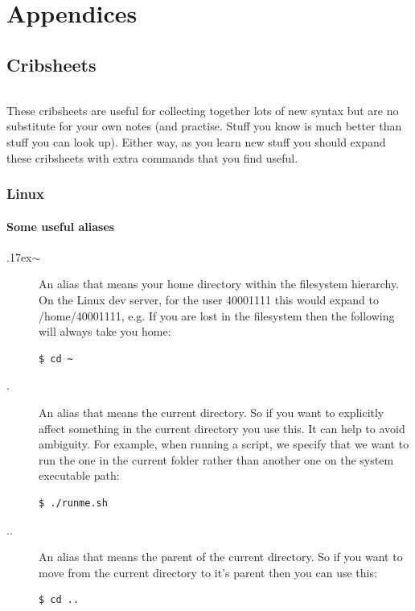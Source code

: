 \documentclass[12pt, a4paper, oneside]{book}
\begin{document}
{\part{Appendices}

\appendix
\chapter{Cribsheets}
\label{cribsheets}
\paragraph{} These cribsheets are useful for collecting together lots of new syntax but are no substitute for your own notes (and practise. Stuff you know is much better than stuff you can look up). Either way, as you learn new stuff you should expand these cribsheets with extra commands that you find useful.

\section{Linux}
\label{cribsheet_linux}

\subsection{Some useful aliases}

\begin{description}
\item[{\raise.17ex\hbox{$\scriptstyle\sim$}}] An alias that means your home directory within the filesystem hierarchy. On the Linux dev server, for the user 40001111 this would expand to /home/40001111, e.g. If you are lost in the filesystem then the following will always take you home:
\begin{lstlisting}[style=DOS]
    $ cd ~
\end{lstlisting}

\item[.] An alias that means the current directory. So if you want to explicitly affect something in the current directory you use this. It can help to avoid ambiguity. For example, when running a script, we specify that we want to run the one in the current folder rather than another one on the system executable path:
\begin{lstlisting}[style=DOS]
    $ ./runme.sh
\end{lstlisting}

\item[..] An alias that means the parent of the current directory. So if you want to move from the current directory to it's parent then you can use this:
\begin{lstlisting}[style=DOS]
    $ cd ..
\end{lstlisting}


\end{description}}
\end{document}

